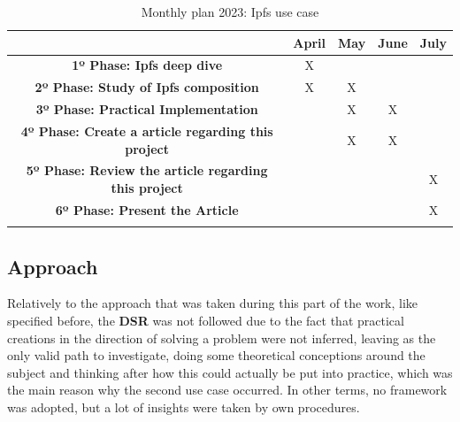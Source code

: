 \begin{longtable}{|c|c|c|c|c|}
    \hline
    & \textbf{April}& \textbf{May} & \textbf{June} & \textbf{July}  \\ \hline

    \textbf{1º Phase: Ipfs deep dive}  & X & & & \\ \hline

    \textbf{2º Phase: Study of Ipfs composition} & X & X & & \\ \hline

    \textbf{3º Phase: Practical Implementation} & & X & X & \\ \hline

    \textbf{4º Phase: Create a article regarding this project} & & X & X &  \\ \hline

    \textbf{5º Phase: Review the article regarding this project} & & & & X \\ \hline

    \textbf{6º Phase: Present the Article} & & & & X \\ \hline
    
    \caption{Monthly plan 2023: Ipfs use case} \label{tab:activity_schedule} 
\end{longtable}

\subsection{Approach}
Relatively to the approach that was taken during this part of the work, like specified before, the \textbf{DSR} was not followed due to the fact that practical creations in the direction of solving a problem were not inferred, leaving as the only valid path to investigate, doing some theoretical conceptions around the subject and thinking after how this could actually be put into practice, which was the main reason why the second use case occurred. In other terms, no framework was adopted, but a lot of insights were taken by own procedures.

